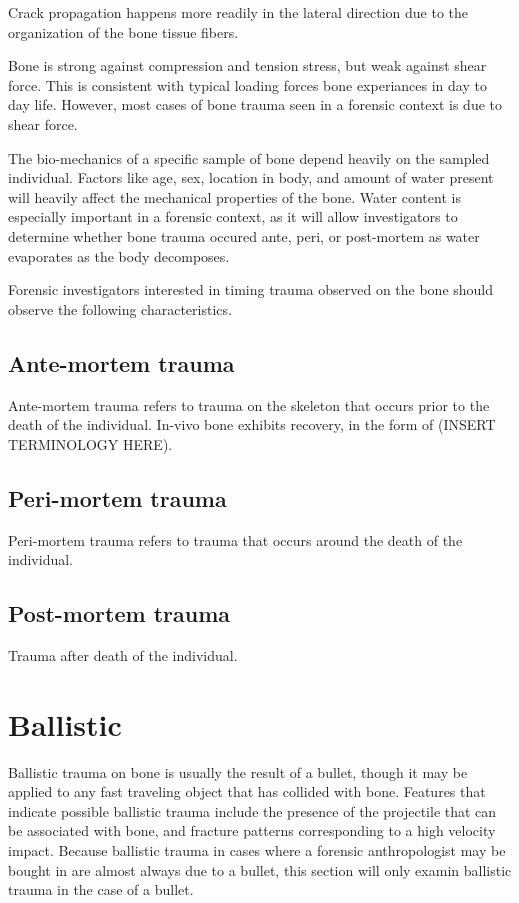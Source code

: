 \documentclass[titlepage]{article}
\begin{document}
Crack propagation happens more readily in the lateral direction due to the organization of the bone tissue fibers. \cite{mechanics}


Bone is strong against compression and tension stress, but weak against shear force. This is consistent with typical loading forces bone experiances in day to day life. However, most cases of bone trauma seen in a forensic context is due to shear force.


The bio-mechanics of a specific sample of bone depend heavily on the sampled individual. Factors like age, sex, location in body, and amount of water present will heavily affect the mechanical properties of the bone. Water content is especially important in a forensic context, as it will allow investigators to determine whether bone trauma occured ante, peri, or post-mortem as water evaporates as the body decomposes.

Forensic investigators interested in timing trauma observed on the bone should observe the following characteristics.

\subsection{Ante-mortem trauma}
Ante-mortem trauma refers to trauma on the skeleton that occurs prior to the death of the individual. In-vivo bone exhibits recovery, in the form of (INSERT TERMINOLOGY HERE).

\subsection{Peri-mortem trauma}
Peri-mortem trauma refers to trauma that occurs around the death of the individual.

\subsection{Post-mortem trauma}
Trauma after death of the individual.

\newpage
\section{Ballistic}
Ballistic trauma on bone is usually the result of a bullet, though it may be applied to any fast traveling object that has collided with bone. Features that indicate possible ballistic trauma include the presence of the projectile that can be associated with bone, and fracture patterns corresponding to a high velocity impact. Because ballistic trauma in cases where a forensic anthropologist may be bought in are almost always due to a bullet, this section will only examin ballistic trauma in the case of a bullet.
\end{document}
